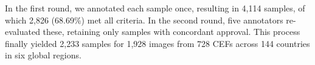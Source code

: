 In the first round, we annotated each sample once, resulting in 4,114 samples, of which 2,826 (68.69\%) met all criteria.
%
In the second round, five annotators re-evaluated these, retaining only samples with concordant approval.
%
This process finally yielded 2,233 samples for 1,928 images from 728 CEFs across 144 countries in six global regions.%
%
